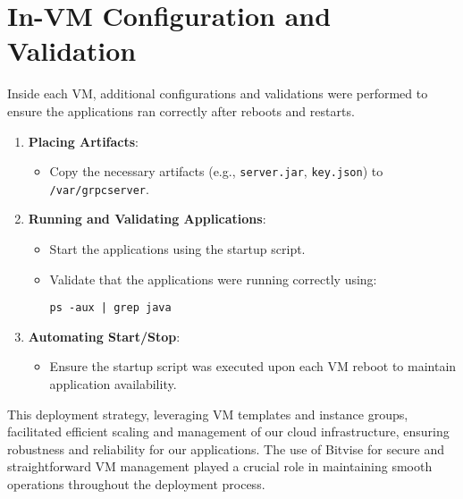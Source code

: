 \section{In-VM Configuration and Validation}\label{sec:in-vm-configuration-and-validation}

Inside each VM, additional configurations and validations were performed to ensure the applications ran correctly after reboots and restarts.

\begin{enumerate}
    \item \textbf{Placing Artifacts}:
    \begin{itemize}
        \item Copy the necessary artifacts (e.g., \texttt{server.jar}, \texttt{key.json}) to \texttt{/var/grpcserver}.
    \end{itemize}

    \item \textbf{Running and Validating Applications}:
    \begin{itemize}
        \item Start the applications using the startup script.
        \item Validate that the applications were running correctly using:
        \begin{verbatim}
ps -aux | grep java
        \end{verbatim}
    \end{itemize}

    \item \textbf{Automating Start/Stop}:
    \begin{itemize}
        \item Ensure the startup script was executed upon each VM reboot to maintain application availability.
    \end{itemize}
\end{enumerate}

This deployment strategy, leveraging VM templates and instance groups, facilitated efficient scaling and management of our cloud infrastructure, ensuring robustness and reliability for our applications. The use of Bitvise for secure and straightforward VM management played a crucial role in maintaining smooth operations throughout the deployment process.



